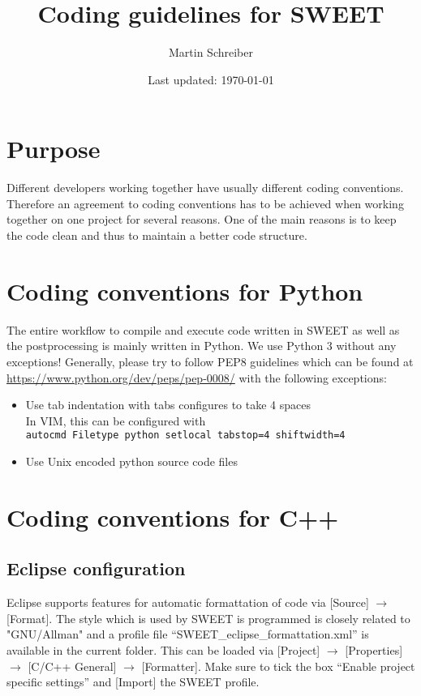 \documentclass[10pt,a4paper]{article}
\author{Martin Schreiber}
\title{Coding guidelines for SWEET}
\date{Last updated: \today}
\begin{document}
\maketitle

\section{Purpose}
Different developers working together have usually different coding conventions.
Therefore an agreement to coding conventions has to be achieved when working together on one project for several reasons.
One of the main reasons is to keep the code clean and thus to maintain a better code structure.

\section{Coding conventions for Python}

The entire workflow to compile and execute code written in SWEET as well as the postprocessing is mainly written in Python.
We use Python 3 without any exceptions!
Generally, please try to follow PEP8 guidelines which can be found at \url{https://www.python.org/dev/peps/pep-0008/} with the following exceptions:

\begin{itemize}
	\item Use tab indentation with tabs configures to take 4 spaces\\
	In VIM, this can be configured with\\
	\texttt{autocmd Filetype python setlocal tabstop=4 shiftwidth=4}
	\item Use Unix encoded python source code files
\end{itemize}




\section{Coding conventions for C++}

\subsection{Eclipse configuration}
Eclipse supports features for automatic formattation of code via [Source] $\rightarrow$ [Format].
The style which is used by SWEET is programmed is closely related to "GNU/Allman" and a profile file ``SWEET\_eclipse\_formattation.xml'' is available in the current folder.
This can be loaded via [Project] $\rightarrow$ [Properties] $\rightarrow$ [C/C++ General] $\rightarrow$ [Formatter].
Make sure to tick the box ``Enable project specific settings'' and [Import] the SWEET profile.
\end{document}
